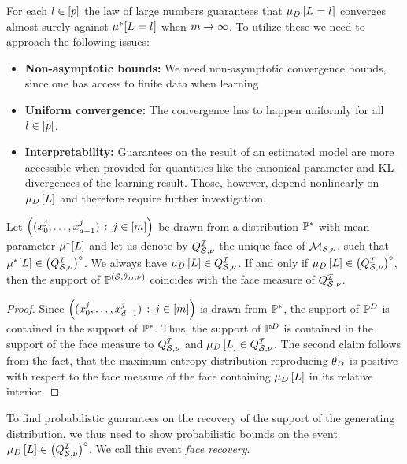 For each $l\in[p]$ the law of large numbers guarantees that $\mu_{D}\left[L_{}=l_{}\right]$ converges almost surely against $\mu^*[L_{}=l_{}]$ when $m\rightarrow\infty$.
To utilize these we need to approach the following issues:
\begin{itemize}
    \item \textbf{Non-asymptotic bounds:} We need non-asymptotic convergence bounds, since one has access to finite data when learning
    \item \textbf{Uniform convergence:} The convergence has to happen uniformly for all $l\in[p]$.
    \item \textbf{Interpretability:} Guarantees on the result of an estimated model are more accessible when provided for quantities like the canonical parameter and KL-divergences of the learning result.
    Those, however, depend nonlinearly on $\mu_{D}\left[L\right]$ and therefore require further investigation.
\end{itemize}



\begin{lemma}
    Let $\left(({x_{0}^{j},\ldots,x_{d-1}^{j}})\,:\,j\in[m]\right)$ be drawn from a distribution $\mathbb{P}^*$ with mean parameter $\mu^*[L]$ and let us denote by $Q^{\mathcal{I}}_{\mathcal{S},\nu}$ the unique face of $\mathcal{M}_{\mathcal{S},\nu}$, such that $\mu^*[L]\in{\left(Q^{\mathcal{I}}_{\mathcal{S},\nu}\right)}^{\circ}$.
    We always have $\mu_{D}\left[L\right]\in Q^{\mathcal{I}}_{\mathcal{S},\nu}$.
    If and only if $\mu_{D}\left[L\right]\in{\left(Q^{\mathcal{I}}_{\mathcal{S},\nu}\right)}^{\circ}$, then the support of $\mathbb{P}^{(\mathcal{S},\theta_{D},\nu)}$ coincides with the face measure of $Q^{\mathcal{I}}_{\mathcal{S},\nu}$.%
\end{lemma}
\begin{proof}
    Since $\left(({x_{0}^{j},\ldots,x_{d-1}^{j}})\,:\,j\in[m]\right)$ is drawn from $\mathbb{P}^*$, the support of $\mathbb{P}^{D}$ is contained in the support of $\mathbb{P}^*$.
    Thus, the support of $\mathbb{P}^{D}$ is contained in the support of the face measure to $Q^{\mathcal{I}}_{\mathcal{S},\nu}$ and $\mu_{D}\left[L\right]\in Q^{\mathcal{I}}_{\mathcal{S},\nu}$.
    The second claim follows from the fact, that the maximum entropy distribution reproducing $\theta_{D}$ is positive with respect to the face measure of the face containing $\mu_{D}\left[L\right]$ in its relative interior.
\end{proof}

To find probabilistic guarantees on the recovery of the support of the generating distribution, we thus need to show probabilistic bounds on the event $\mu_{D}\left[L\right]\in{\left(Q^{\mathcal{I}}_{\mathcal{S},\nu}\right)}^{\circ}$.
We call this event \emph{face recovery}.

